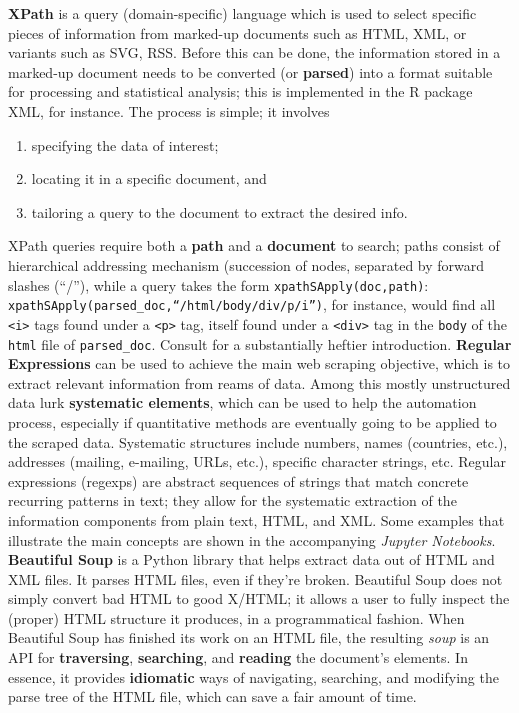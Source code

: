 \textbf{XPath} is a query (domain-specific) language which is 
used to select specific pieces of information from marked-up documents such as HTML, XML, or variants such as SVG, RSS. Before this can be done, the information stored in a marked-up document needs to be converted (or \textbf{parsed}) into a format suitable for processing and statistical analysis; this is implemented in the R package XML, for instance. The process is simple; it involves 
\begin{enumerate}[noitemsep]
\item specifying the data of interest;
\item locating it in a specific document, and
\item tailoring a query to the document to extract the desired info.
\end{enumerate}
XPath queries require both a \textbf{path} and a \textbf{document} to search; paths consist of hierarchical addressing mechanism (succession of nodes, separated by forward slashes (``/''), while a query takes the form \small\texttt{xpathSApply(doc,path)}\normalsize :\\
\footnotesize\texttt{xpathSApply(parsed\_doc,``/html/body/div/p/i'')}\normalsize, for instance, would find all \texttt{<i>} tags found under a \texttt{<p>} tag, itself found under a \texttt{<div>} tag in the \texttt{body} of the \texttt{html} file of \texttt{parsed\_doc}. Consult \cite{DC_MRMN} for a substantially heftier introduction. 
\newl\textbf{Regular Expressions} can be used to achieve the main web scraping objective, which is to extract  relevant information from reams of data. Among this mostly unstructured data lurk \textbf{systematic elements}, which can be used to help the automation process, especially if quantitative methods are eventually going to be applied to the scraped data. Systematic structures include numbers, names (countries, etc.), addresses (mailing, e-mailing, URLs, etc.), specific character strings, etc. Regular expressions (regexps) are abstract sequences of strings that match concrete recurring patterns in text; they allow for the systematic extraction of the information components from plain text, HTML, and XML. Some examples that illustrate the main concepts are shown in the accompanying \textit{Jupyter Notebooks}. %
\newl\textbf{Beautiful Soup} is a Python library that helps extract data out of HTML and XML files. It parses HTML files, even if they're broken. Beautiful Soup does not simply convert bad HTML to good X/HTML; it allows a user to fully inspect the (proper) HTML structure it produces, in a programmatical fashion. When Beautiful Soup has finished its work on an HTML file, the resulting \textit{soup} is an API for \textbf{traversing}, \textbf{searching}, and \textbf{reading} the document's elements. In essence, it provides \textbf{idiomatic} ways of navigating, searching, and modifying the parse tree of the HTML file, which can save a fair amount of time.
